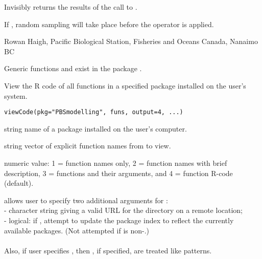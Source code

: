 \documentclass[letterpaper]{book}
\begin{document}
%
\begin{Value}
Invisibly returns the results of the call to .
\end{Value}
%
\begin{Note}\relax
If , random sampling will take place before the  operator is applied.
\end{Note}
%
\begin{Author}\relax
Rowan Haigh, Pacific Biological Station, Fisheries and Oceans Canada, Nanaimo BC
\end{Author}
%
\begin{SeeAlso}\relax
Generic functions  and  exist in the package .
\end{SeeAlso}
%
\begin{Description}\relax
View the R code of all functions in a specified package 
installed on the user's system.
\end{Description}
%
\begin{Usage}
\begin{verbatim}
viewCode(pkg="PBSmodelling", funs, output=4, ...)
\end{verbatim}
\end{Usage}
%
\begin{Arguments}
\begin{ldescription}
\item[\code{pkg}]  string name of a package installed on the user's computer. 
\item[\code{funs}]  string vector of explicit function names from  to view. 
\item[\code{output}]  numeric value: 1 = function names only, 2 = function names with brief description,
3 = functions and their arguments, and 4 = function R-code (default). 
\item[\code{...}] allows user to specify two additional arguments for : \\{}
 - character string giving a valid URL for the 
directory on a remote location; \\{}
 - logical: if , attempt to update the package
index to reflect the currently available packages. 
(Not attempted if  is non-.) \\{} \\{}
Also, if user specifies , then , if specified,
are treated like patterns. 
\end{ldescription}
\end{Arguments}
\end{document}
